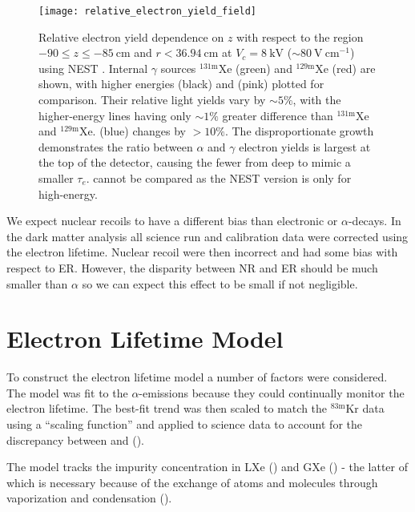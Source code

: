 \begin{figure}
\centering
\texttt{[image: relative\_electron\_yield\_field]}
\caption{Relative electron yield dependence on $z$ with respect to the region $-90 \leq z \leq -85\ \mathrm{cm}$ and
$r < 36.94\ \mathrm{cm}$ at $V_c = 8\ \mathrm{kV}$ (${\sim}80\ \mathrm{V\ cm^{-1}}$) using NEST .  Internal
$\gamma$ sources $\mathrm{^{131m}Xe}$ (green) and
$\mathrm{^{129m}Xe}$
(red) are shown, with higher energies  (black) and  (pink) plotted for comparison. Their relative
light yields vary by ${\sim} 5\%$, with the higher-energy lines having only ${\sim} 1\%$ greater difference than $\mathrm{^{131m}Xe}$ and
$\mathrm{^{129m}Xe}$.   (blue) changes by $> 10\%$.  The disproportionate growth demonstrates the ratio between
$\alpha$ and $\gamma$ electron yields is largest at the top of the detector, causing the fewer \electron from deep \alphadecays to
mimic a smaller $\tau_e$.  \metakr cannot be compared as the NEST version is only for high-energy.}
\label{fig:electron_lifetimes_rn222_vs_kr83m_field_z}
\end{figure}

We expect nuclear recoils to have a different bias than electronic or $\alpha$-decays.  In the dark matter analysis all
science run and calibration data were corrected using the \metakr electron lifetime.  Nuclear recoil \cstwob were then incorrect and had
some bias with respect to ER.  However, the disparity between NR and ER should be much smaller than $\alpha$ so we can expect this effect
to be small if not negligible.



\section{Electron Lifetime Model}
\label{sec:electron_lifetime_model}
To construct the electron lifetime model a number of factors were considered.  The model was fit to the  $\alpha$-emissions
because they could continually monitor the electron lifetime.  The best-fit trend was then scaled to match the $\mathrm{^{83m}Kr}$ data
using a ``scaling function'' and applied to science data to account for the discrepancy between \alphadecays and \metakr
().

The model tracks the impurity concentration in LXe (\il) and GXe (\ig) - the latter of which is necessary because of the
exchange of atoms and molecules through vaporization and condensation ().



